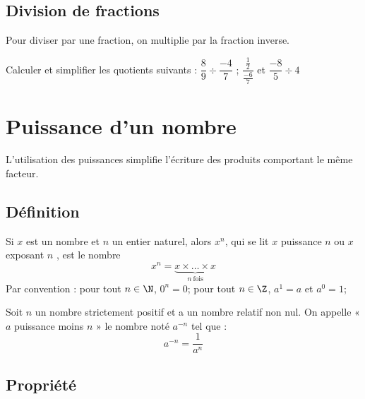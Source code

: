 \documentclass[a4paper,10pt]{report}
\begin{document}
\subsection{Division de fractions}

\begin{memento}
Pour diviser par une fraction, on multiplie par la fraction inverse. 
 \end{memento}

\begin{ex}
Calculer et simplifier les quotients suivants : \quad $\dfrac{8}{9} \div \dfrac{-4}{7}$ \quad ; \quad $\dfrac{\frac{1}{2}}{\frac{-6}{7}}$ \quad et \quad $\dfrac{-8}{5} \div 4$
 
\medskip\noindent\grandscarreaux{\linewidth}{5.6cm}
\end{ex}
 
\section{Puissance d'un nombre}

L'utilisation des puissances simplifie l'écriture des produits comportant le même facteur.

\subsection{Définition}

\begin{defn}
Si $x$ est un nombre et $n$ un entier naturel, alors $x^n$, qui se lit \og $x$ puissance $n$ \fg{} ou \og $x$ exposant $n$ \fg{}, est le nombre \[ x^n=\underset{n\ \text{fois} }{\underbrace{x\times \dots \times x}} \]
Par convention : pour tout $n \in \N$, $0^{n} = 0$; pour tout $n \in \Z$, $a^1 = a$ \quad et \quad $a^0 = 1$;
\end{defn}

\begin{defn}
Soit $n$ un nombre strictement positif et a un nombre relatif non nul. On appelle « $a$ puissance moins $n$ » le nombre noté $a^{-n}$ tel que :  $$a^{-n} = \dfrac{1}{a^n}$$
\end{defn}

\begin{ex}
 
\medskip\noindent\grandscarreaux{\linewidth}{3.2cm}
\end{ex}

\subsection{Propriété}
\end{document}
